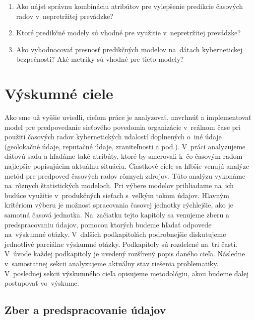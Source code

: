 \documentclass[thesismargins, thesislinespacing, openright, upjsfrontpage]{rnthesis}
\begin{document}
\begin{enumerate}
  \item Ako nájsť správnu kombináciu atribútov pre vylepšenie predikcie časových radov v~nepretržitej prevádzke?
  \item Ktoré predikčné modely sú vhodné pre využitie v~nepretržitej prevádzke?
  \item Ako vyhodnocovať presnosť predikčných modelov na~dátach kybernetickej bezpečnosti? Aké metriky sú vhodné pre tieto modely?
\end{enumerate}


\chapter{Výskumné ciele}

Ako sme už vyššie uviedli, cieľom práce je analyzovať, navrhnúť a implementovať model pre predpovedanie sieťového povedomia organizácie v~reálnom čase pri použití časových radov kybernetických udalostí doplnených o~iné údaje (geolokačné údaje, reputačné údaje, zraniteľnosti a pod.). V~práci analyzujeme dátovú sadu a hľadáme také atribúty, ktoré by smerovali k~čo časovým radom najlepšie popisujúcim aktuálnu situáciu. Čiastkové ciele sa hlbšie venujú analýze metód pre predpoveď časových radov rôznych zdrojov. Túto analýzu vykonáme na~rôznych štatistických modeloch. Pri výbere modelov prihliadame na~ich budúce využitie v~produkčných sieťach s~veľkým tokom údajov. Hlavným kritériom výberu je možnosť spracovania časovej jednotky rýchlejšie, ako je samotná časová jednotka. Na~začiatku tejto kapitoly sa venujeme zberu a predspracovaniu údajov, pomocou ktorých budeme hľadať odpovede na~výskumné otázky. V~ďalších podkapitolách podrobnejšie diskutujeme jednotlivé parciálne výskumné otázky. Podkapitoly sú rozdelené na~tri časti. V~úvode každej podkapitoly je uvedený rozšírený popis daného cieľa. Následne v~samostatnej sekcii analyzujeme aktuálny stav riešenia problematiky. V~poslednej sekcii výskumného cieľa opisujeme metodológiu, akou budeme ďalej postupovať vo~výskume. 

\section{Zber a predspracovanie údajov}
\end{document}
